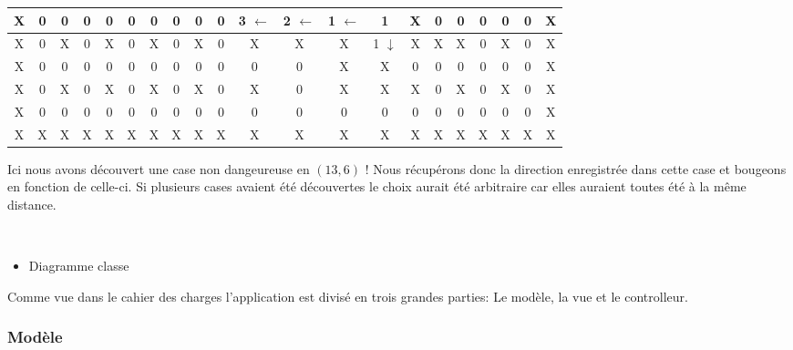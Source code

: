 \begin{center}
\begin{tabular}{|c|c|c|c|c|c|c|c|c|c|c|c|c|c|c|c|c|c|c|c|c|}
				\cellcolor{cyan}X & 0 & 0 & 0 & 0 & 0 & 0 & 0 & 0 & 0 & \cellcolor{orange}3 $\leftarrow$ & \cellcolor{orange}2 $\leftarrow$ & \cellcolor{orange}1 $\leftarrow$ & \cellcolor{orange}1 & \cellcolor{gray}X & 0 & 0 & 0 & 0 & 0 & \cellcolor{cyan}X \\\hline
				\cellcolor{cyan}X & 0 & \cellcolor{cyan}X & 0 & \cellcolor{cyan}X & 0 & \cellcolor{cyan}X & 0 & \cellcolor{cyan}X & 0 & \cellcolor{cyan}X & \cellcolor{cyan}X & \cellcolor{cyan}X & \cellcolor{orange}1 $\downarrow$ & \cellcolor{cyan}X & \cellcolor{cyan}X & \cellcolor{cyan}X & 0 & \cellcolor{cyan}X & 0 & \cellcolor{cyan}X \\\hline
				\cellcolor{cyan}X & 0 & 0 & 0 & 0 & 0 & 0 & 0 & 0 & 0 & 0 & 0 & \cellcolor{cyan}X & \cellcolor{gray}X & 0 & 0 & 0 & 0 & 0 & 0 & \cellcolor{cyan}X \\\hline
				\cellcolor{cyan}X & 0 & \cellcolor{cyan}X & 0 & \cellcolor{cyan}X & 0 & \cellcolor{cyan}X & 0 & \cellcolor{cyan}X & 0 & \cellcolor{cyan}X & 0 & \cellcolor{cyan}X & \cellcolor{cyan}X & \cellcolor{cyan}X & 0 & \cellcolor{cyan}X & 0 & \cellcolor{cyan}X & 0 & \cellcolor{cyan}X \\\hline
				\cellcolor{cyan}X & 0 & 0 & 0 & 0 & 0 & 0 & 0 & 0 & 0 & 0 & 0 & 0 & 0 & 0 & 0 & 0 & 0 & 0 & 0 &
				\cellcolor{cyan}X \\\hline \rowcolor{cyan}X & X & X & X & X & X & X & X & X & X & X & X & X & X & X & X & X & X & X & X & X \\\hline
				\end{tabular}
			\end{center}
			
			Ici nous avons découvert une case non dangeureuse en $(13,6)$ !
			Nous récupérons donc la direction enregistrée dans cette case et bougeons en fonction de celle-ci.
			Si plusieurs cases avaient été découvertes le choix aurait été arbitraire car elles auraient toutes été à la même distance.
			
			$\,$
			
	\begin{itemize}
		\item{Diagramme classe}
	\end{itemize}
	
	Comme vue dans le cahier des charges l'application est divisé en trois grandes parties: Le modèle, la vue et le controlleur.
	
	\subsubsection{Modèle}
	
